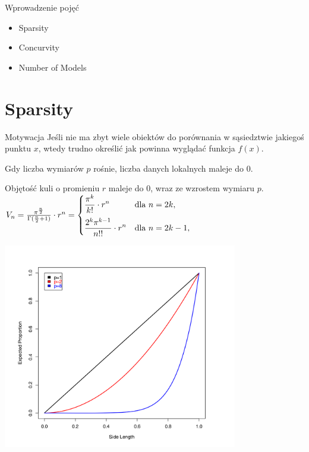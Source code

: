 \documentclass[a4paper]{beamer}
\begin{document}
\begin{frame}
\begin{block}{Wprowadzenie pojęć}
\begin{itemize}
\item Sparsity
\item Concurvity
\item Number of Models
\end{itemize}
\end{block}

\end{frame}

\section{Sparsity}
\begin{frame}
\begin{block}{Motywacja}
Jeśli nie ma zbyt wiele obiektów do porównania w sąsiedztwie jakiegoś punktu $x$, wtedy trudno określić jak powinna wyglądać funkcja $f(x)$.
\end{block}
\begin{block}{}
Gdy liczba wymiarów $p$ rośnie, liczba danych lokalnych maleje do 0. 
\end{block}
\begin{block}{}
Objętość kuli o promieniu $r$ maleje do 0, wraz ze wzrostem wymiaru $p$. \\
$V_{n}=\frac { \pi^{\frac{n}{2}}}{\Gamma (\frac{n}{2}+1)}\cdot r^{n} = \begin{cases} \displaystyle {\pi^k\over k!}\cdot r^n & \mbox{dla }n=2k, \\[2ex] \displaystyle {2^k \pi^{k-1}\over n!!}\cdot r^n & \mbox{dla } n=2k-1, \end{cases}$
\end{block}
\end{frame}

\begin{frame}

\begin{center}
\includegraphics[height=9cm]{ball.png}
\end{center}
\end{frame}
\end{document}
